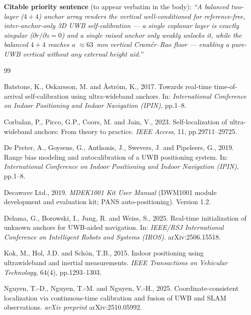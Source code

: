 \documentclass[11pt,a4paper]{article}
\begin{document}
\textbf{Citable priority sentence} (to appear verbatim in the body): \emph{``A balanced two-layer
($4{+}4$) anchor array renders the vertical \emph{well-conditioned} for reference-free, inter-anchor-only 3D UWB
self-calibration --- a single coplanar layer is exactly singular ($\partial r/\partial z = 0$) and a single raised anchor only weakly unlocks it, while
the balanced $4{+}4$ reaches a ${\approx}63$~mm vertical Cram\'{e}r--Rao floor --- enabling a pure-UWB
vertical without any external height aid.''}

\begin{thebibliography}{99}

 Batstone, K., Oskarsson, M. and \AA{}str\"om, K.,
2017. Towards real-time time-of-arrival self-calibration using ultra-wideband anchors. In:
\emph{International Conference on Indoor Positioning and Indoor Navigation (IPIN)}, pp.1--8.

 Corbalan, P., Picco, G.P., Coors, M. and Jain, V.,
2023. Self-localization of ultra-wideband anchors: From theory to practice. \emph{IEEE Access}, 11,
pp.29711--29725.

 De Preter, A., Goysens, G., Anthonis, J., Swevers,
J. and Pipeleers, G., 2019. Range bias modeling and autocalibration of a UWB positioning system. In:
\emph{International Conference on Indoor Positioning and Indoor Navigation (IPIN)}, pp.1--8.

 Decawave Ltd., 2019. \emph{MDEK1001 Kit User Manual}
(DWM1001 module development and evaluation kit; PANS auto-positioning). Version 1.2.

 Delama, G., Borowski, I., Jung, R. and Weiss, S., 2025.
Real-time initialization of unknown anchors for UWB-aided navigation. In: \emph{IEEE/RSJ
International Conference on Intelligent Robots and Systems (IROS)}. arXiv:2506.15518.

 Kok, M., Hol, J.D. and Sch\"on, T.B., 2015. Indoor positioning
using ultrawideband and inertial measurements. \emph{IEEE Transactions on Vehicular Technology},
64(4), pp.1293--1303.

 Nguyen, T.-D., Nguyen, T.-M. and Nguyen, V.-H., 2025.
Coordinate-consistent localization via continuous-time calibration and fusion of UWB and SLAM
observations. \emph{arXiv preprint} arXiv:2510.05992.


\end{thebibliography}
\end{document}
